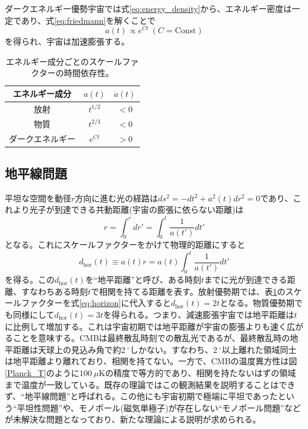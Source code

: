 ダークエネルギー優勢宇宙では式\eqref{eq:energy_density}から、エネルギー密度は一定であり、式\eqref{eq:friedmann}を解くことで
\begin{equation}
  a(t) \propto e^{Ct} ~ (C = \mathrm{Const})
\end{equation}
を得られ、宇宙は加速膨張する。
\begin{table}[htbp]
  \centering
  \caption{エネルギー成分ごとのスケールファクターの時間依存性。}
  \vspace{3mm}
  \begin{tabular}{ccc} \hline\hline
    エネルギー成分 & $a(t)$ & $\ddot{a}(t)$ \\ \hline
    放射 & $t^{1/2}$ & $< 0$ \\
    物質 & $t^{2/3}$ & $< 0$ \\
    ダークエネルギー & $e^{Ct}$ & $> 0$ \\ \hline\hline
  \end{tabular}
  \label{rad_vs_mat}
\end{table}

\subsection{地平線問題}
平坦な空間を動径$r$方向に進む光の経路は$ds^{2} = -dt^{2} + a^{2}(t)dr^{2} = 0$であり、これより光子が到達できる共動距離(宇宙の膨張に依らない距離)は
\begin{equation}
  r = \int_{0}^{r}dr' = \int_{0}^{t}\frac{1}{a(t')}dt'
\end{equation}
となる。これにスケールファクターをかけて物理的距離にすると
\begin{equation}
  d_{\mathrm{hor}}(t)\equiv a(t)r = a(t)\int_{0}^{t}\frac{1}{a(t')}dt' \label{eq:horizon}
\end{equation}
を得る。この$d_{\mathrm{hor}}(t)$を``地平距離''と呼び、ある時刻$t$までに光が到達できる距離、すなわちある時刻$t$で相関を持てる距離を表す。放射優勢期では、表\ref{rad_vs_mat}のスケールファクターを式\eqref{eq:horizon}に代入すると$d_{\mathrm{hor}}(t) = 2t$となる。物質優勢期でも同様にして$d_{\mathrm{hor}}(t) = 3t$を得られる。つまり、減速膨張宇宙では地平距離は$t$に比例して増加する。これは宇宙初期では地平距離が宇宙の膨張よりも速く広がることを意味する。CMBは最終散乱時刻での散乱光であるが、最終散乱時の地平距離は天球上の見込み角で約$\SI{2}{^{\circ}}$しかない。すなわち、$\SI{2}{^{\circ}}$以上離れた領域同士は地平距離より離れており、相関を持てない。一方で、CMBの温度異方性は図\ref{Planck_T}のように$\SI{100}{\mu\mathrm{K}}$の精度で等方的であり、相関を持たないはずの領域まで温度が一致している。既存の理論ではこの観測結果を説明することはできず、``地平線問題''と呼ばれる。この他にも宇宙初期で極端に平坦であったという``平坦性問題''や、モノポール(磁気単極子)が存在しない``モノポール問題''などが未解決な問題となっており、新たな理論による説明が求められる。

